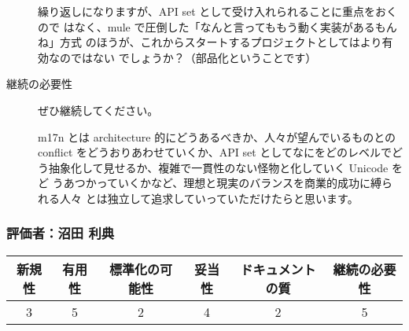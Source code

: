 \begin{description}
繰り返しになりますが、API set として受け入れられることに重点をおくので
はなく、mule で圧倒した「なんと言ってももう動く実装があるもんね」方式
のほうが、これからスタートするプロジェクトとしてはより有効なのではない
でしょうか？（部品化ということです）

\item[継続の必要性]

ぜひ継続してください。

m17n とは architecture 的にどうあるべきか、人々が望んでいるものとの 
conflict をどうおりあわせていくか、API set としてなにをどのレベルでど
う抽象化して見せるか、複雑で一貫性のない怪物と化していく Unicode をど
うあつかっていくかなど、理想と現実のバランスを商業的成功に縛られる人々
とは独立して追求していっていただけたらと思います。

\end{description}

\subsubsection{評価者：沼田 利典}

\begin{tabular}{|c|c|c|c|c|c|}
\hline
新規性 & 有用性 & 標準化の可能性 & 妥当性 & ドキュメントの質 & 継続の必要性 \\
\hline
3 & 5 & 2 & 4 & 2 & 5\\
\hline
\end{tabular}

